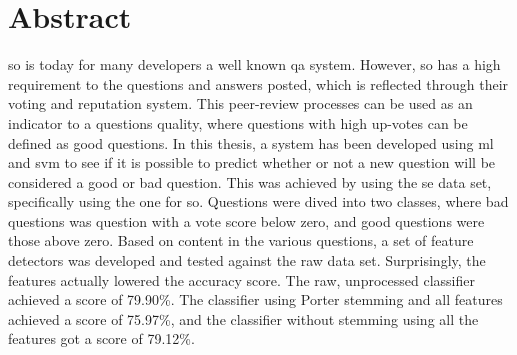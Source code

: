\chapter*{Abstract}
\gls{so} is today for many developers a well known \gls{qa} system. 
However, \gls{so} has a high requirement to the questions and answers posted, which is reflected through their voting and reputation system. 
This peer-review processes can be used as an indicator to a questions quality, where questions with high up-votes can be defined as good questions.
In this thesis, a system has been developed using  \gls{ml} and \gls{svm} to see if it is possible to predict whether or not a new question will be 
considered a good or bad question. 
\vspace{0.5em}\newline
This was achieved by using the \gls{se} data set, specifically using the one for \gls{so}. 
Questions were dived into two classes, where bad questions was question with a vote score below zero, and good questions were those above zero. 
Based on content in the various questions, a set of feature detectors was developed and tested against the raw data set. 
Surprisingly, the features actually lowered the accuracy score.
The raw, unprocessed classifier achieved a score of 79.90\%.
The classifier using Porter stemming and all features achieved a score of 75.97\%, and the classifier without stemming using all the features got a score of 79.12\%.

\hypersetup{pageanchor=false}